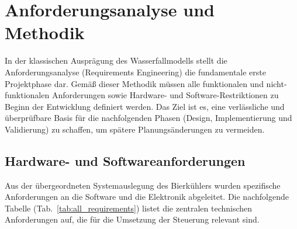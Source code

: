 \chapter{Anforderungsanalyse und Methodik}
\label{cha:anforderungsanalyse}

In der klassischen Ausprägung des Wasserfallmodells stellt die Anforderungsanalyse (Requirements Engineering) die fundamentale erste Projektphase dar. Gemäß dieser Methodik müssen alle funktionalen und nicht-funktionalen Anforderungen sowie Hardware- und Software-Restriktionen zu Beginn der Entwicklung definiert werden. Das Ziel ist es, eine verlässliche und überprüfbare Basis für die nachfolgenden Phasen (Design, Implementierung und Validierung) zu schaffen, um spätere Planungsänderungen zu vermeiden.

\section{Hardware- und Softwareanforderungen}
Aus der übergeordneten Systemauslegung des Bierkühlers wurden spezifische Anforderungen an die Software und die Elektronik abgeleitet. Die nachfolgende Tabelle (Tab.~\ref{tab:all_requirements}) listet die zentralen technischen Anforderungen auf, die für die Umsetzung der Steuerung relevant sind.

